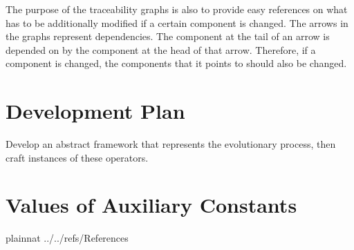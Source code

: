 \documentclass[12pt]{article}
\newcommand{\tref}[1]{TM\ref{#1}}
\begin{document}

The purpose of the traceability graphs is also to provide easy references on
what has to be additionally modified if a certain component is changed.  The
arrows in the graphs represent dependencies. The component at the tail of an
arrow is depended on by the component at the head of that arrow. Therefore, if a
component is changed, the components that it points to should also be
changed. 
















\section{Development Plan}

Develop an abstract framework that represents the evolutionary process, then craft instances of these operators.

\section{Values of Auxiliary Constants}



\newpage

 {plainnat}
 {../../refs/References}

\newpage
\end{document}
